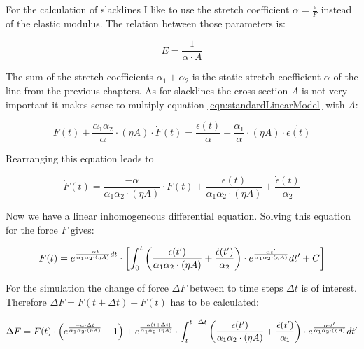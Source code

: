 For the calculation of slacklines I like to use the stretch coefficient $\alpha = \frac{\epsilon}{F}$ instead of the elastic modulus. The relation between those parameters is:

\begin{equation}
	E = \frac{1}{\alpha\cdot A}
\end{equation}

The sum of the stretch coefficients $\alpha_1+\alpha_2$ is the static stretch coefficient $\alpha$ of the line from the previous chapters. As for slacklines the cross section $A$ is not very important it makes sense to multiply equation \ref{eqn:standardLinearModel} with $A$:

\begin{equation}
F(t) + \frac{\alpha_1\alpha_2}{\alpha}\cdot (\eta A)\cdot\dot F(t) = \frac{\epsilon(t)}{\alpha} + \frac{\alpha_1}{\alpha}\cdot (\eta A)\cdot\dot{\epsilon(t)}
\end{equation}

Rearranging this equation leads to

\begin{equation}
	\dot F(t) = \frac{-\alpha}{\alpha_1\alpha_2\cdot (\eta A)} \cdot F(t) + \frac{\epsilon (t)}{\alpha_1\alpha_2\cdot(\eta A)} + \frac{\dot{\epsilon} (t)}{\alpha_2}
\end{equation}

Now we have a linear inhomogeneous differential equation. Solving this equation for the force $F$ gives:

\begin{equation}
\begin{split}
	F(t) \insertForSmartphone{&}= e^{ \frac{-\alpha t}{\alpha_1\alpha_2\cdot (\eta A)} dt } \cdot \insertForSmartphone{\\ &}\left[ \int_0^t \left( \frac{\epsilon (t')}{\alpha_1\alpha_2\cdot (\eta A)} + \frac{\dot{\epsilon}   (t')}{\alpha_2} \right) \cdot e^{\frac{\alpha t'}{\alpha_1\alpha_2\cdot (\eta A)}} dt' + C \right]
\end{split}
\end{equation}

For the simulation the change of force $\Delta F$ between to time steps $\Delta t$ is of interest. Therefore $\Delta F = F(t+\Delta t) - F(t)$ has to be calculated:

\begin{equation}
\begin{split}
	\Delta F = F(t)\cdot \left( e^{\frac{-\alpha\cdot \Delta t}{\alpha_1\alpha_2\cdot(\eta A)}} - 1 \right) + e^{\frac{-\alpha(t+\Delta t)}{\alpha_1\alpha_2\cdot (\eta A)}} \cdot \insertForSmartphone{\\} \int_t^{t+\Delta t} \left( \frac{\epsilon (t')}{\alpha_1\alpha_2\cdot(\eta A)} + \frac{\dot{ \epsilon} (t')}{\alpha_1} \right) \cdot e^{\frac{\alpha\cdot t'}{\alpha_1\alpha_2\cdot (\eta A)}} dt'
\end{split}
\end{equation}

